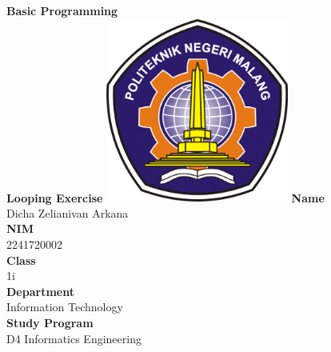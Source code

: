 \documentclass[12pt,titlepage]{article}
\newcommand{\vSubject}{Basic Programming}
\newcommand{\vSubtitle}{Looping Exercise}
\newcommand{\vName}{Dicha Zelianivan Arkana}
\newcommand{\vNIM}{2241720002}
\newcommand{\vClass}{1i}
\newcommand{\vDepartment}{Information Technology}
\newcommand{\vStudyProgram}{D4 Informatics Engineering}
\begin{document}
\begin{titlepage}
    \centering
    \vfill
    {\bfseries\LARGE
        \vSubject\\
        \vskip0.25cm
        \vSubtitle
    }
    \vfill
    \includegraphics[width=6cm]{images/polinema-logo.png}
    \vfill
    {
        \textbf{Name}\\
        \vName\\
        \vskip0.5cm
        \textbf{NIM}\\
        \vNIM\\
        \vskip0.5cm
        \textbf{Class}\\
        \vClass\\
        \vskip0.5cm
        \textbf{Department}\\
        \vDepartment\\
        \vskip0.5cm
        \textbf{Study Program}\\
        \vStudyProgram
    }
\end{titlepage}
\end{document}
